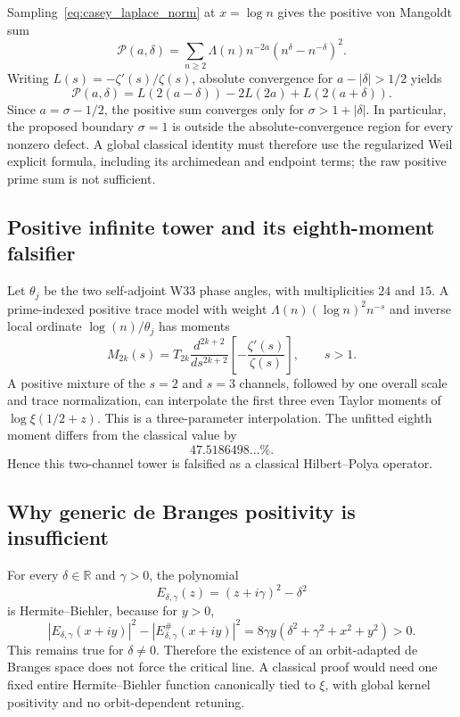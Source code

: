 Sampling~\eqref{eq:casey_laplace_norm} at $x=\log n$ gives the positive
von Mangoldt sum
\begin{equation}
 \mathcal P(a,\delta)
 =\sum_{n\ge2}\Lambda(n)n^{-2a}
       \left(n^\delta-n^{-\delta}\right)^2.
\end{equation}
Writing $L(s)=-\zeta'(s)/\zeta(s)$, absolute convergence for
$a-|\delta|>1/2$ yields
\begin{equation}
 \mathcal P(a,\delta)
 =L(2(a-\delta))-2L(2a)+L(2(a+\delta)).
 \label{eq:prime_second_difference}
\end{equation}
Since $a=\sigma-1/2$, the positive sum converges only for
$\sigma>1+|\delta|$. In particular, the proposed boundary $\sigma=1$ is
outside the absolute-convergence region for every nonzero defect. A global
classical identity must therefore use the regularized Weil explicit formula,
including its archimedean and endpoint terms; the raw positive prime sum is
not sufficient.

\subsection{Positive infinite tower and its eighth-moment falsifier}

Let $\theta_j$ be the two self-adjoint W33 phase angles, with multiplicities
$24$ and $15$. A prime-indexed positive trace model with weight
$\Lambda(n)(\log n)^2n^{-s}$ and inverse local ordinate
$\log(n)/\theta_j$ has moments
\begin{equation}
 M_{2k}(s)=T_{2k}\frac{d^{2k+2}}{ds^{2k+2}}
          \left[-\frac{\zeta'(s)}{\zeta(s)}\right],
 \qquad s>1.
\end{equation}
A positive mixture of the $s=2$ and $s=3$ channels, followed by one overall
scale and trace normalization, can interpolate the first three even Taylor
moments of $\log\xi(1/2+z)$. This is a three-parameter interpolation. The
unfitted eighth moment differs from the classical value by
\[
 47.5186498\ldots\%.
\]
Hence this two-channel tower is falsified as a classical Hilbert--Polya
operator.

\subsection{Why generic de Branges positivity is insufficient}

For every $\delta\in\mathbb R$ and $\gamma>0$, the polynomial
\[
 E_{\delta,\gamma}(z)=(z+i\gamma)^2-\delta^2
\]
is Hermite--Biehler, because for $y>0$,
\begin{equation}
 |E_{\delta,\gamma}(x+iy)|^2
 -|E_{\delta,\gamma}^{\#}(x+iy)|^2
 =8\gamma y(\delta^2+\gamma^2+x^2+y^2)>0.
\end{equation}
This remains true for $\delta\ne0$. Therefore the existence of an
orbit-adapted de Branges space does not force the critical line. A classical
proof would need one fixed entire Hermite--Biehler function canonically tied
to $\xi$, with global kernel positivity and no orbit-dependent retuning.

